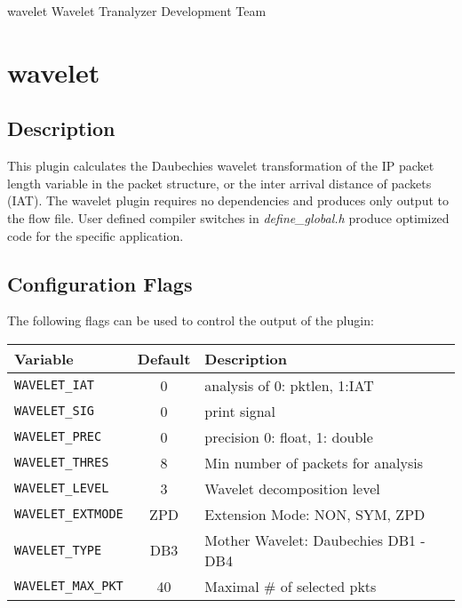 \documentclass[documentation]{subfiles}
\begin{document}
\trantitle
    {wavelet} %
    {Wavelet} %
    {Tranalyzer Development Team}

\section{wavelet}\label{s:wavelet}

\subsection{Description}
This plugin calculates the Daubechies wavelet transformation of the IP packet length variable in the packet structure, or the
inter arrival distance of packets (IAT).
The wavelet plugin requires no dependencies and produces only output to the flow file.
User defined compiler switches in {\em define\_global.h} produce optimized code for the specific application.

\subsection{Configuration Flags}
The following flags can be used to control the output of the plugin:
\begin{longtable}{lcl}
    \toprule
    {\bf Variable} & {\bf Default} & {\bf Description} \\
    \midrule\endhead%
    {\tt WAVELET\_IAT} & 0 & analysis of 0: pktlen, 1:IAT\\
    {\tt WAVELET\_SIG} & 0 & print signal\\
    {\tt WAVELET\_PREC} & 0 & precision 0: float, 1: double\\
    {\tt WAVELET\_THRES} & 8 & Min number of packets for analysis\\
    {\tt WAVELET\_LEVEL} & 3 & Wavelet decomposition level \\
    {\tt WAVELET\_EXTMODE} & ZPD & Extension Mode: NON, SYM, ZPD \\
    {\tt WAVELET\_TYPE} & DB3 & Mother Wavelet: Daubechies DB1 - DB4 \\
    {\tt WAVELET\_MAX\_PKT} & 40 & Maximal \# of selected pkts\\
    \bottomrule
\end{longtable}

\end{document}

